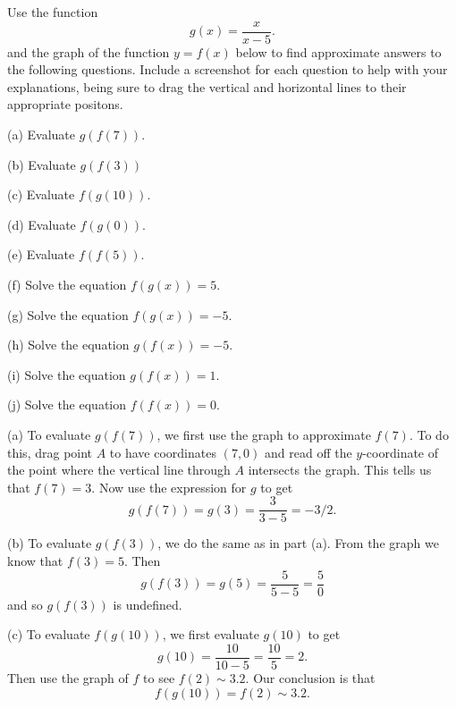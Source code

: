 \documentclass{ximera}
\begin{document}
\begin{example} \label{Ex2:Comp}
Use the function
\[
   g(x) = \frac{x}{x-5} .
\]
and the graph of the function $y=f(x)$ below to find approximate answers to the following questions. Include a screenshot for each question to help with your explanations, being sure to drag the vertical and horizontal lines to their appropriate positons. 

(a) Evaluate $g(f(7))$.

(b) Evaluate $g(f(3))$

(c) Evaluate $f(g(10))$.

(d) Evaluate $f(g(0))$.

(e) Evaluate $f(f(5))$.

(f) Solve the equation $f(g(x))=5$.

(g) Solve the equation $f(g(x))=-5$.

(h) Solve the equation $g(f(x))=-5$.

(i) Solve the equation $g(f(x))=1$.

(j) Solve the equation $f(f(x))=0$.

 
\begin{onlineOnly}
    \begin{center}
\end{center}
\end{onlineOnly}

\begin{explanation}
(a) To evaluate $g(f(7))$, we first use the graph to approximate $f(7)$. To do this, drag point $A$ to have coordinates $(7,0)$ and read off the $y$-coordinate of the point where the vertical line through $A$ intersects the graph. This tells us that $f(7)= 3$. Now use the expression for $g$ to get
\[
     g(f(7)) = g(3) = \frac{3}{3-5} = -3/2.
\]

(b) To evaluate $g(f(3))$, we do the same as in part (a). From the graph we know that $f(3)=5$. Then
\[
  g(f(3)) = g(5) = \frac{5}{5-5} = \frac{5}{0}
\]
and so $g(f(3))$ is undefined.

(c) To evaluate $f(g(10))$, we first evaluate $g(10)$ to get
\[
     g(10) = \frac{10}{10-5} = \frac{10}{5} =2.
\]
Then use the graph of $f$ to see $f(2) \sim 3.2$. Our conclusion is that 
\[
    f(g(10)) =f(2) \sim 3.2 .
\]

\end{explanation}


\end{example}
\end{document}
